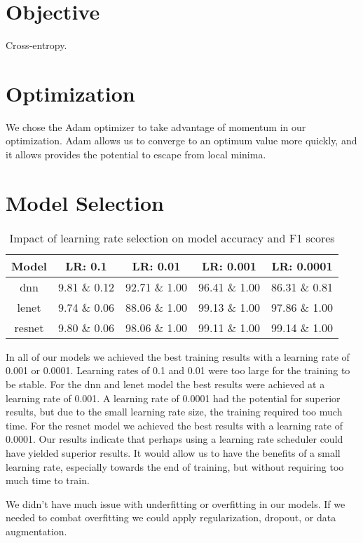 \documentclass{article}
\begin{document}
\section{Objective}
Cross-entropy.

\section{Optimization}
We chose the Adam optimizer to take advantage of momentum in our optimization.
Adam allows us to converge to an optimum value more quickly, and it allows
provides the potential to escape from local minima.

\section{Model Selection}

\begin{table}[h]
\begin{center}
\begin{tabular}{c|c|c|c|c}
    Model & LR: 0.1 & LR: 0.01 & LR: 0.001 & LR: 0.0001 \\
    \hline
    dnn & 9.81 \& 0.12 & 92.71 \& 1.00 & 96.41 \& 1.00 & 86.31 \& 0.81 \\
    lenet & 9.74 \& 0.06 & 88.06 \& 1.00 & 99.13 \& 1.00 & 97.86 \& 1.00 \\
    resnet & 9.80 \& 0.06 & 98.06 \& 1.00 & 99.11 \& 1.00 & 99.14 \& 1.00
\end{tabular}
\end{center}
\caption{Impact of learning rate selection on model accuracy and F1 scores}
\label{table:learning_rate_selection}
\end{table}

In all of our models we achieved the best training results with a learning rate of
0.001 or 0.0001. Learning rates of 0.1 and 0.01 were too large for the training to be
stable. For the dnn and lenet model the best results were achieved at a learning rate
of 0.001. A learning rate of 0.0001 had the potential for superior results, but due to
the small learning rate size, the training required too much time. For the resnet model
we achieved the best results with a learning rate of 0.0001. Our results indicate that
perhaps using a learning rate scheduler could have yielded superior results. It would
allow us to have the benefits of a small learning rate, especially towards the end of
training, but without requiring too much time to train.

We didn't have much issue with underfitting or overfitting in our models. If we needed
to combat overfitting we could apply regularization, dropout, or data augmentation.
\end{document}
